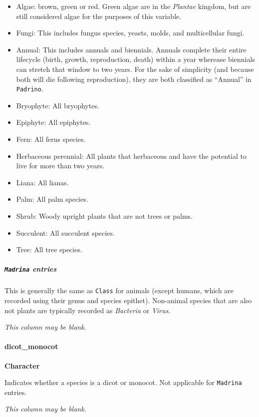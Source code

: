 \documentclass[]{article}
\let\oldparagraph\paragraph
\renewcommand{\paragraph}[1]{\oldparagraph{#1}\mbox{}}
\let\oldsubparagraph\subparagraph
\renewcommand{\subparagraph}[1]{\oldsubparagraph{#1}\mbox{}}
\begin{document}
\begin{itemize}
\item
  Algae: brown, green or red. Green algae are in the \emph{Plantae}
  kingdom, but are still considered algae for the purposes of this
  variable.
\item
  Fungi: This includes fungus species, yeasts, molds, and multicellular
  fungi.
\item
  Annual: This includes annuals and biennials. Annuals complete their
  entire lifecycle (birth, growth, reproduction, death) within a year
  wherease biennials can stretch that window to two years. For the sake
  of simplicity (and because both will die following reproduction), they
  are both classified as ``Annual'' in \texttt{Padrino}.
\item
  Bryophyte: All bryophytes.
\item
  Epiphyte: All epiphytes.
\item
  Fern: All ferns species.
\item
  Herbaceous perennial: All plants that herbaceous and have the
  potential to live for more than two years.
\item
  Liana: All lianas.
\item
  Palm: All palm species.
\item
  Shrub: Woody upright plants that are not trees or palms.
\item
  Succulent: All succulent species.
\item
  Tree: All tree species.
\end{itemize}

\subparagraph{\texorpdfstring{\texttt{Madrina}
entries}{Madrina entries}}\label{madrina-entries}

This is generally the same as \texttt{Class} for animals (except humans,
which are recorded using their genus and species epithet). Non-animal
species that are also not plants are typically recorded as
\emph{Bacteria} or \emph{Virus}.

\emph{This column may be blank}.

\paragraph{dicot\_monocot}\label{dicot_monocot}

\textbf{Character}

Indicates whether a species is a dicot or monocot. Not applicable for
\texttt{Madrina} entries.

\emph{This column may be blank.}
\end{document}
